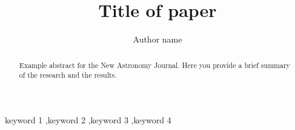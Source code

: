 \documentclass[final,5p,times,twocolumn,authoryear]{elsarticle}
\begin{document}
\begin{frontmatter}



\title{Title of paper}


\author[first]{Author name}

\begin{abstract}
Example abstract for the New Astronomy Journal. Here you provide a brief summary of the research and the results.
\end{abstract}



\begin{keyword}
keyword 1 \sep keyword 2 \sep keyword 3 \sep keyword 4



\end{keyword}


\end{frontmatter}
\end{document}
